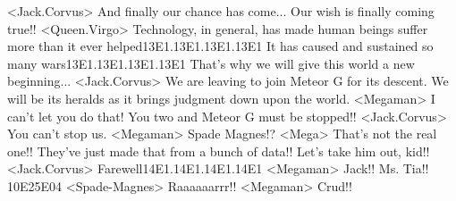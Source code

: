 <Jack.Corvus> And finally our chance has come... 
Our wish is finally coming true!! 
<Queen.Virgo> Technology, in general, has made human beings suffer more than it ever helped{13}{E1}.{13}{E1}.{13}{E1}.{13}{E1} 
It has caused and sustained so many wars{13}{E1}.{13}{E1}.{13}{E1}.{13}{E1} 
That's why we will give this world a new beginning... 
<Jack.Corvus> We are leaving to join Meteor G for its descent. 
We will be its heralds as it brings judgment down upon the world. 
<Megaman> I can't let you do that! 
You two and Meteor G must be stopped!! 
<Jack.Corvus> You can't stop us. 
<Megaman> Spade Magnes!? 
<Mega> That's not the real one!! They've just made that from a bunch of data!! 
Let's take him out, kid!! 
<Jack.Corvus> Farewell{14}{E1}.{14}{E1}.{14}{E1}.{14}{E1} 
<Megaman> Jack!! Ms. Tia!! 
{10}{E2}{5E}{04} 
<Spade-Magnes> Raaaaaarrr!! 
<Megaman> Crud!! 
